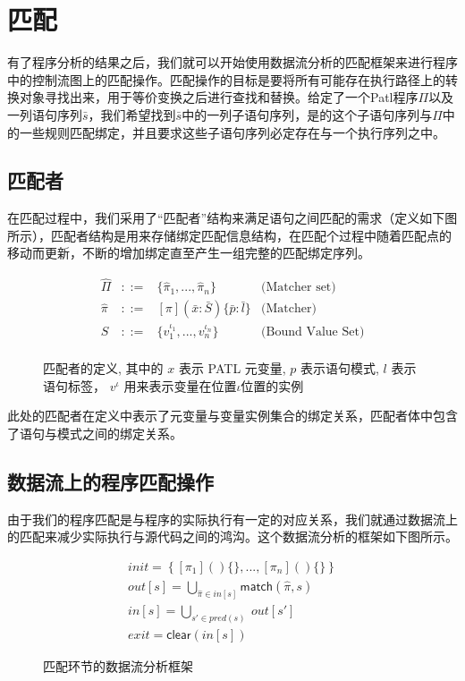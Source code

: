 \section{匹配}

有了程序分析的结果之后，我们就可以开始使用数据流分析的匹配框架来进行程序中的控制流图上的匹配操作。匹配操作的目标是要将所有可能存在执行路径上的转换对象寻找出来，用于等价变换之后进行查找和替换。给定了一个Patl程序$\Pi$以及一列语句序列$\bar{s}$，我们希望找到$\bar{s}$中的一列子语句序列，是的这个子语句序列与$\Pi$中的一些规则匹配绑定，并且要求这些子语句序列必定存在与一个执行序列之中。

\subsection{匹配者}

在匹配过程中，我们采用了“匹配者”结构来满足语句之间匹配的需求（定义如下图所示），匹配者结构是用来存储绑定匹配信息结构，在匹配个过程中随着匹配点的移动而更新，不断的增加绑定直至产生一组完整的匹配绑定序列。

\begin{figure}[ht]
\[
\begin{array}{rcll}
	\hat\Pi &::=&\big\{\hat\pi_1,...,\hat\pi_n\big\} &\text{(Matcher set)}\\
	\hat\pi &::=& [\pi](\bar{x}:\bar{S})\{\bar{p}:\bar{l}\} &\text{(Matcher)}\\
	S 		&::=& \big\{v_1^{\iota_1},...,v_n^{\iota_n}\big\}  	& \text{(Bound Value Set)}\\
\end{array}
\]
\caption{匹配者的定义, 其中的 $x$ 表示 PATL 元变量, $p$ 表示语句模式, $l$ 表示语句标签， $v^{\iota}$ 用来表示变量在位置$\iota$位置的实例}
\label{fig:matcher}
\end{figure}

此处的匹配者在定义中表示了元变量与变量实例集合的绑定关系，匹配者体中包含了语句与模式之间的绑定关系。

\subsection{数据流上的程序匹配操作}

由于我们的程序匹配是与程序的实际执行有一定的对应关系，我们就通过数据流上的匹配来减少实际执行与源代码之间的鸿沟。这个数据流分析的框架如下图所示。


\begin{figure}[t]
\[
	\begin{array}{lll}
		\mathit{init} = \left\{[\pi_1]()\{\},...,[\pi_n]()\{\}\right\}\\
		\mathit{out}[s] = \bigcup_{\hat\pi\in \mathit{in}[s]}\mathsf{match}(\hat\pi,s)\\
		\mathit{in}[s] = \bigcup_{s'\in \mathit{pred}(s)} ~\mathit{out}[s']\\
		\mathit{exit} = \mathsf{clear}(\mathit{in}[s])
	\end{array}
\]
\caption{匹配环节的数据流分析框架}
\label{fig:dfa}
\end{figure}

